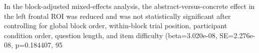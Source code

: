 In the block-adjusted mixed-effects analysis, the abstract-versus-concrete effect in the left frontal ROI was reduced and was not statistically significant after controlling for global block order, within-block trial position, participant condition order, question length, and item difficulty (beta=3.020e-08, SE=2.276e-08, p=0.184407, 95%
